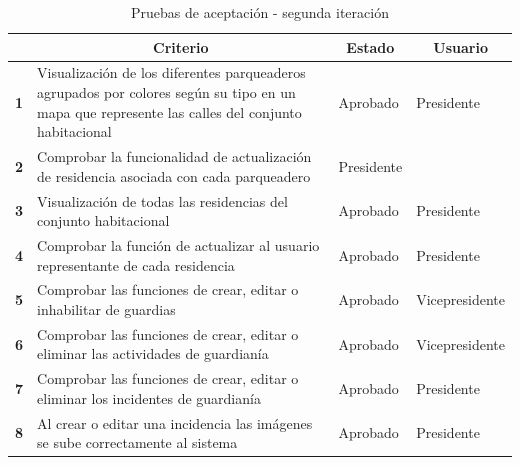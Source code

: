 \begin{spacing}{1}
    \begin{center}


    \renewcommand*{\arraystretch}{1.4}
    \begin{longtable}{ |>{\bfseries}l|p{}|l|l| }
        \caption{Pruebas de aceptación - segunda iteración}\\
        \hline
        \multicolumn{1}{|c|}{ \textbf{N.}} & \multicolumn{1}{c|}{\textbf{Criterio}} & \multicolumn{1}{c|}{ \textbf{Estado}} & \multicolumn{1}{c|}{ \textbf{Usuario}}\\
        \hline
        1 & Visualización de los diferentes parqueaderos agrupados por colores según su tipo en un mapa que represente las calles del conjunto habitacional & Aprobado & Presidente\\
        \hline
        2 & Comprobar la funcionalidad de actualización de residencia asociada con cada parqueadero & Presidente\\
        \hline
        3 & Visualización de todas las residencias del conjunto habitacional & Aprobado & Presidente\\
        \hline
        4 & Comprobar la función de actualizar al usuario representante de cada residencia & Aprobado & Presidente\\
        \hline
        5 & Comprobar las funciones de crear, editar o inhabilitar de guardias & Aprobado & Vicepresidente\\
        \hline
        6 & Comprobar las funciones de crear, editar o eliminar las actividades de guardianía & Aprobado & Vicepresidente\\
        \hline
        7 & Comprobar las funciones de crear, editar o eliminar los incidentes de guardianía & Aprobado & Presidente\\
        \hline
        8 & Al crear o editar una incidencia las imágenes se sube correctamente al sistema & Aprobado & Presidente\\


\end{longtable}
\end{center}
\end{spacing}
